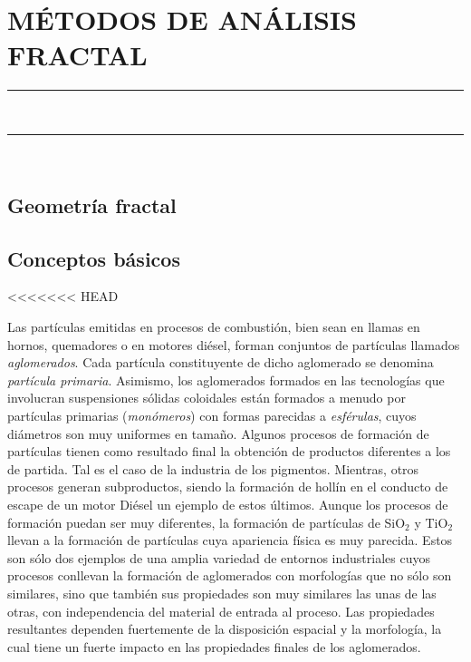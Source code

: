 \chapter{MÉTODOS DE ANÁLISIS FRACTAL}\label{cap:MetodosAnalisisFractal}
\noindent\rule{\linewidth}{1.3pt}\\
\startcontents[chapters]
\noindent\rule{\linewidth}{1.1pt}\\
\newpage
\section{Geometría fractal}\label{sec:GeometriaFractal}
\section{Conceptos básicos}\label{sec:ConceptosBasicosDimension}
<<<<<<< HEAD
\par Las partículas emitidas en procesos de combustión, bien sean en llamas en hornos, quemadores o en motores diésel, forman conjuntos de partículas llamados  \emph{aglomerados}. Cada partícula constituyente de dicho aglomerado se denomina  \emph{partícula primaria}. Asimismo, los aglomerados formados en las tecnologías que involucran suspensiones sólidas coloidales están formados a menudo por partículas primarias (\emph{monómeros}) con formas parecidas a  \emph{esférulas}, cuyos diámetros son muy uniformes en tamaño. Algunos procesos de formación de partículas tienen como resultado final la obtención de productos diferentes a los de partida. Tal es el caso de la industria de los pigmentos. Mientras, otros procesos generan subproductos, siendo la formación de hollín en el conducto de escape de un motor Diésel un ejemplo de estos últimos. Aunque los procesos de formación puedan ser muy diferentes, la formación de partículas de SiO$_2$ y TiO$_2$ llevan a la formación de partículas cuya apariencia física es muy parecida. Estos son sólo dos ejemplos de una amplia variedad de entornos industriales cuyos procesos conllevan la formación de aglomerados con morfologías que no sólo son similares, sino que también sus propiedades son muy similares las unas de las otras, con independencia del material de entrada al proceso. Las propiedades resultantes dependen fuertemente de la disposición espacial y la morfología, la cual tiene un fuerte impacto en las propiedades finales de los aglomerados.

